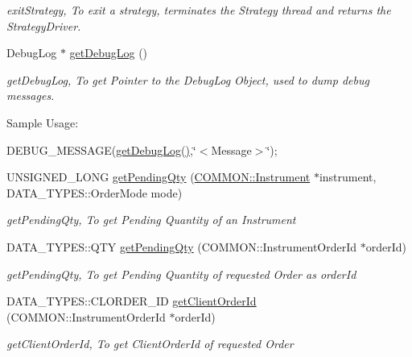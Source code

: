 \begin{DoxyCompactItemize}
\begin{DoxyCompactList}\small\item\em exit\-Strategy, To exit a strategy, terminates the Strategy thread and returns the Strategy\-Driver. \end{DoxyCompactList}\item 
Debug\-Log $\ast$ \hyperlink{class_a_p_i2_1_1_s_g_context_adf0389e54a6dec09889cd219521a1b87}{get\-Debug\-Log} ()
\begin{DoxyCompactList}\small\item\em get\-Debug\-Log, To get Pointer to the Debug\-Log Object, used to dump debug messages. \par
 Sample Usage\-:\par
 D\-E\-B\-U\-G\-\_\-\-M\-E\-S\-S\-A\-G\-E(\hyperlink{class_a_p_i2_1_1_s_g_context_adf0389e54a6dec09889cd219521a1b87}{get\-Debug\-Log()},\char`\"{}$<$\-Message$>$\char`\"{}); \end{DoxyCompactList}\item 
U\-N\-S\-I\-G\-N\-E\-D\-\_\-\-L\-O\-N\-G \hyperlink{class_a_p_i2_1_1_s_g_context_a7153ac0ed3d06ff7b670d2667c0878c3}{get\-Pending\-Qty} (\hyperlink{class_a_p_i2_1_1_c_o_m_m_o_n_1_1_instrument}{C\-O\-M\-M\-O\-N\-::\-Instrument} $\ast$instrument, D\-A\-T\-A\-\_\-\-T\-Y\-P\-E\-S\-::\-Order\-Mode mode)
\begin{DoxyCompactList}\small\item\em get\-Pending\-Qty, To get Pending Quantity of an Instrument \end{DoxyCompactList}\item 
D\-A\-T\-A\-\_\-\-T\-Y\-P\-E\-S\-::\-Q\-T\-Y \hyperlink{class_a_p_i2_1_1_s_g_context_a3e769f6514bc235a16c7495b9d8c70e9}{get\-Pending\-Qty} (C\-O\-M\-M\-O\-N\-::\-Instrument\-Order\-Id $\ast$order\-Id)
\begin{DoxyCompactList}\small\item\em get\-Pending\-Qty, To get Pending Quantity of requested Order as order\-Id \end{DoxyCompactList}\item 
D\-A\-T\-A\-\_\-\-T\-Y\-P\-E\-S\-::\-C\-L\-O\-R\-D\-E\-R\-\_\-\-I\-D \hyperlink{class_a_p_i2_1_1_s_g_context_a4eb246662184d5dbbfd1694279bb4b9b}{get\-Client\-Order\-Id} (C\-O\-M\-M\-O\-N\-::\-Instrument\-Order\-Id $\ast$order\-Id)
\begin{DoxyCompactList}\small\item\em get\-Client\-Order\-Id, To get Client\-Order\-Id of requested Order \end{DoxyCompactList}\item 

\end{DoxyCompactItemize}
